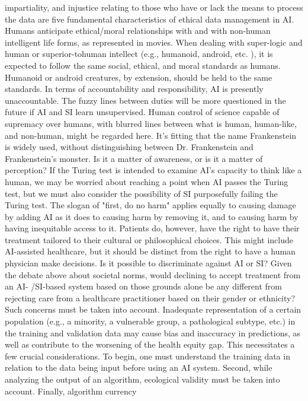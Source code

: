 \documentclass[12pt]{article}
\begin{document}
impartiality, and injustice relating to those who have or lack the means to process the data are five fundamental
characteristics of ethical data management in AI.
\\ Humans anticipate ethical/moral relationships with and with non-human intelligent life forms, as represented in
movies. When dealing with super-logic and human or superior-tohuman intellect (e.g., humanoid, android, etc. ),
it is expected to follow the same social, ethical, and moral standards as humans. Humanoid or android creatures, by extension, should be held to the same standards. In terms of accountability and responsibility, AI is presently
unaccountable. The fuzzy lines between duties will be more questioned in the future if AI and SI learn
unsupervised. Human control of science capable of supremacy over humans, with blurred lines between what is
human, human-like, and non-human, might be regarded here. It's fitting that the name Frankenstein is widely
used, without distinguishing between Dr. Frankenstein and Frankenstein's monster. Is it a matter of awareness, or is it a matter of perception? If the Turing test is intended to examine AI's capacity to think like a human, we
may be worried about reaching a point when AI passes the Turing test, but we must also consider the possibility
of SI purposefully failing the Turing test. The slogan of "first, do no harm" applies equally to causing damage by adding AI as it does to causing harm by
removing it, and to causing harm by having inequitable access to it. Patients do, however, have the right to have
their treatment tailored to their cultural or philosophical choices. This might include AI-assisted healthcare, but
it should be distinct from the right to have a human physician make decisions. Is it possible to discriminate
against AI or SI? Given the debate above about societal norms, would declining to accept treatment from an AI- /SI-based system based on those grounds alone be any different from rejecting care from a healthcare
practitioner based on their gender or ethnicity? Such concerns must be taken into account.
Inadequate representation of a certain population (e.g., a minority, a vulnerable group, a pathological subtype, etc.) in the training and validation data may cause bias and inaccuracy in predictions, as well as contribute to
the worsening of the health equity gap. This necessitates a few crucial considerations. To begin, one must
understand the training data in relation to the data being input before using an AI system. Second, while
analyzing the output of an algorithm, ecological validity must be taken into account. Finally, algorithm currency
\end{document}
